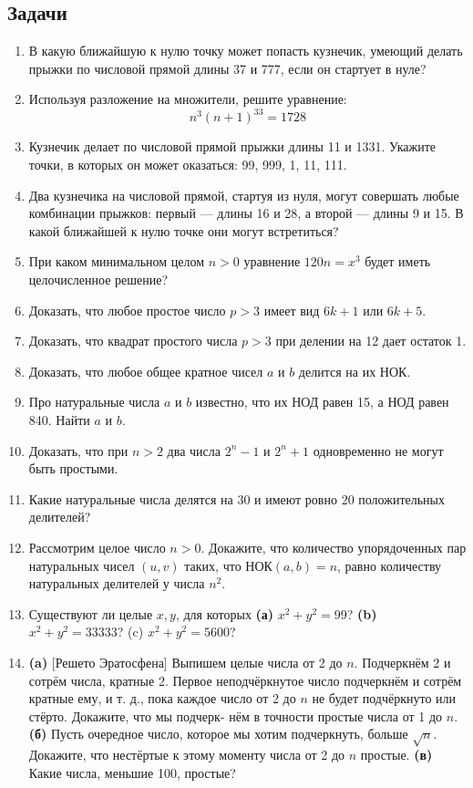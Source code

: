 \subsection*{Задачи}

\begin{enumerate}
\item В какую ближайшую к нулю точку может попасть кузнечик, умеющий делать прыжки по числовой прямой длины 37 и 777, если он стартует в нуле?
\item Используя разложение на множители, решите уравнение:
$$
n^3 (n + 1)^33 = 1728
$$
\item Кузнечик делает по числовой прямой прыжки длины 11 и 1331. Укажите точки, в которых он может оказаться: 99, 999, 1, 11, 111.
\item Два кузнечика на числовой прямой, стартуя из нуля, могут совершать любые комбинации прыжков: первый --- длины 16 и 28, а второй --- длины 9 и 15. В какой ближайшей к нулю точке они могут встретиться?
\item При каком минимальном целом $n > 0$ уравнение $120n = x^3$ будет иметь целочисленное решение?
\item Доказать, что любое простое число $p>3$ имеет вид $6k+1$ или $6k+5$.
\item Доказать, что квадрат простого числа $p>3$ при делении на 12 дает остаток 1.
\item Доказать, что любое общее кратное чисел $a$ и $b$ делится на их НОК.
\item Про натуральные числа $a$ и $b$ известно, что их НОД равен 15, а НОД равен 840. Найти $a$ и $b$.
\item Доказать, что при $n>2$ два числа $2^n-1$ и $2^n+1$ одновременно не могут быть простыми.

\item Какие натуральные числа делятся на 30 и имеют ровно 20 положительных делителей?
\item Рассмотрим целое число $n>0$. Докажите, что количество упорядоченных пар натуральных чисел $(u,v)$ таких, что НОК$(a,b)=n$, равно количеству натуральных делителей у числа $n^2$.
\item Существуют ли целые $x, y$, для которых \textbf{(а)} $x^2 + y^2 = 99$? \textbf{(b)}
$x^2 + y^2 = 33333$? (c) $x^2 + y^2 = 5600$?

\item \textbf{(a)} [Решето Эратосфена] Выпишем целые числа от 2 до $n$. Подчеркнём
 2 и сотрём числа, кратные 2. Первое неподчёркнутое число
подчеркнём и сотрём кратные ему, и т. д., пока каждое число от 2
до $n$ не будет подчёркнуто или стёрто. Докажите, что мы подчерк-
нём в точности простые числа от 1 до $n$. \textbf{(б)} Пусть очередное число,
которое мы хотим подчеркнуть, больше $\sqrt n$. Докажите, что нестёртые к этому моменту
 числа от 2 до $n$ простые. \textbf{(в)} Какие числа, меньшие 100, простые?


\end{enumerate}
